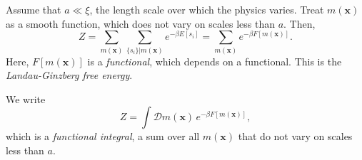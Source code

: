 \documentclass[12pt]{article}
\begin{document}
Assume that $a \ll \xi$, the length scale over which the physics varies. Treat $m(\mathbf{x})$ as a smooth function, which does not vary on scales less than $a$. Then,
\[
	Z = \sum_{m(\mathbf{x})} \sum_{\{s_i\} | m(\mathbf{x})} e^{-\beta E[s_i]} = \sum_{m (\mathbf{x})} e^{-\beta F[m(\mathbf{x})]}.
\]
Here, $F[m(\mathbf{x})]$ is a \emph{functional}, which depends on a functional. This is the \emph{Landau-Ginzberg free energy}.

We write
\[
	Z = \int \mathcal{D} m(\mathbf{x}) \, e^{-\beta F[m(\mathbf{x})]},
\]
which is a \emph{functional integral}, a sum over all $m(\mathbf{x})$ that do not vary on scales less than $a$.


\newpage

\printindex
\end{document}
